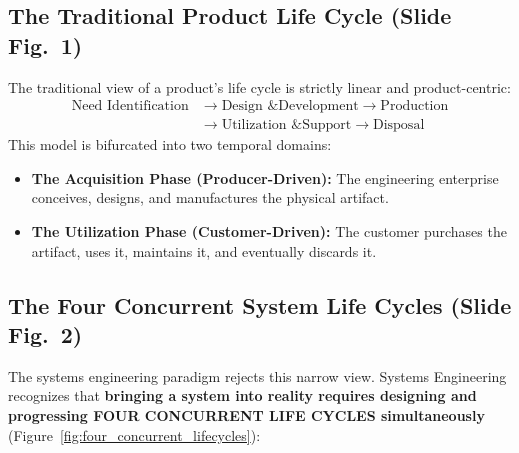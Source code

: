 \subsection{The Traditional Product Life Cycle (Slide Fig.~1)}
The traditional view of a product's life cycle is strictly linear and product-centric:
\begin{equation}
\begin{aligned}
    \text{Need Identification} &\longrightarrow \text{Design \& Development} \longrightarrow \text{Production} \\
    &\longrightarrow \text{Utilization \& Support} \longrightarrow \text{Disposal}
\end{aligned}
\end{equation}
This model is bifurcated into two temporal domains:
\begin{itemize}[leftmargin=1.5em]
    \item \textbf{The Acquisition Phase (Producer-Driven):} The engineering enterprise conceives, designs, and manufactures the physical artifact.
    \item \textbf{The Utilization Phase (Customer-Driven):} The customer purchases the artifact, uses it, maintains it, and eventually discards it.
\end{itemize}

\subsection{The Four Concurrent System Life Cycles (Slide Fig.~2)}
The systems engineering paradigm rejects this narrow view. Systems Engineering recognizes that \textbf{bringing a system into reality requires designing and progressing FOUR CONCURRENT LIFE CYCLES simultaneously} (Figure~\ref{fig:four_concurrent_lifecycles}):

